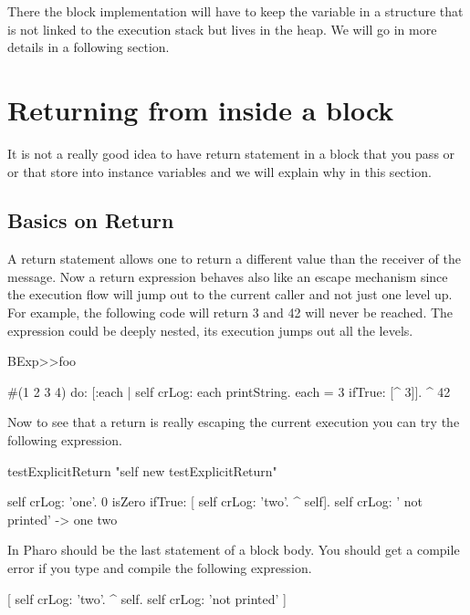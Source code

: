 \documentclass[a4paper,10pt,twoside]{book}
\begin{document}
There the block implementation will have to keep the variable in a structure that is not linked to the execution stack but lives in the heap. We will go in more details in a following section. 





\section{Returning from inside a block}
It is not a really good idea to have return statement in a block that you pass or or that store into instance variables and we will explain why in this section.

\subsection{Basics on Return}
A return statement allows one to return a different value than the receiver of the message.
Now a return expression behaves also like an escape mechanism since the execution flow will jump out to the current caller and not just one level up. For example, the following code will return 3 and 42 will never be reached. The expression \ct{[^3]} could be deeply nested, its execution jumps out all the levels.

\begin{code}{}
BExp>>foo
	
	#(1 2 3 4) do: [:each | self crLog: each printString. 
						each = 3 
							ifTrue: [^ 3]].						
	^ 42
\end{code}

Now to see that a return is really escaping the current execution you can try the following expression. 

\begin{code}{}
testExplicitReturn
	"self new testExplicitReturn"
	
	self crLog: 'one'.
	0 isZero ifTrue: [ self crLog: 'two'. ^ self].
	self crLog: ' not printed'
-> one two
\end{code}



In Pharo \ct{^} should be the last statement of a block body. You should get a compile error if you type and compile the following expression. 

\begin{code}{}
[ self crLog: 'two'.
  ^ self.  
  self crLog: 'not printed' ]
\end{code}
\end{document}
